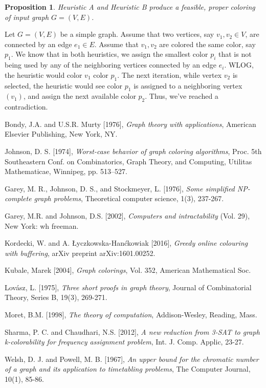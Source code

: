\documentclass{article}
\newtheorem{prop}{Proposition}
\theoremstyle{definition}
\begin{document}
\begin{prop}
Heuristic A and Heuristic B produce a feasible, proper coloring of input graph \(G = (V, E)\).
\end{prop}

Let \(G = (V, E)\) be a simple graph. Assume that two vertices, say \(v_1, v_2 \in V\), are connected by an edge \(e_1 \in E\). Assume that \(v_1, v_2\) are colored the same color, say \(p_1\). We know that in both heuristics, we assign the smallest color \(p_i\) that is not being used by any of the neighboring vertices connected by an edge \(e_i\). WLOG, the heuristic would color \(v_1\) color \(p_1\). The next iteration, while vertex \(v_2\) is selected, the heuristic would see color \(p_1\) is assigned to a neighboring vertex \((v_1)\), and assign the next available color \(p_2\). Thus, we've reached a contradiction.



\begin{thebibliography}{9}
Bondy, J.A. and U.S.R. Murty [1976],
\emph{Graph theory with applications},
American Elsevier Publishing, New York, NY.

Johnson, D. S. [1974], \emph{Worst-case behavior of graph coloring algorithms}, Proc. 5th Southeastern Conf. on Combinatorics, Graph Theory, and Computing, Utilitas Mathematicae, Winnipeg, pp. 513–527.

Garey, M. R., Johnson, D. S., and Stockmeyer, L. [1976], \emph{Some simplified NP-complete graph problems}, Theoretical computer science, 1(3), 237-267.

Garey, M.R. and Johnson, D.S. [2002], \emph{Computers and intractability} (Vol. 29), New York: wh freeman.

Kordecki, W. and A. Łyczkowska-Hanćkowiak [2016], \emph{Greedy online colouring with buffering}, arXiv preprint arXiv:1601.00252.

Kubale, Marek [2004], \emph{Graph colorings}, Vol. 352, American Mathematical Soc.

Lovász, L. [1975], \emph{Three short proofs in graph theory}, Journal of Combinatorial Theory, Series B, 19(3), 269-271.

Moret, B.M. [1998], \emph{The theory of computation}, Addison-Wesley, Reading, Mass.

Sharma, P. C. and Chaudhari, N.S. [2012], \emph{A new reduction from 3-SAT to graph k-colorability for frequency assignment problem}, Int. J. Comp. Applic, 23-27.

Welsh, D. J. and Powell, M. B. [1967], \emph{An upper bound for the chromatic number of a graph and its application to timetabling problems}, The Computer Journal, 10(1), 85-86.

\end{thebibliography}
\end{document}
